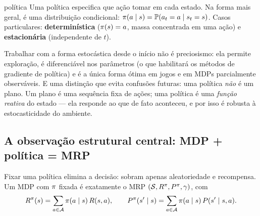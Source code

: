 \documentclass[11pt, a4paper]{article}
\begin{document}
\begin{center}
\end{center}

\begin{defbox}{política}
Uma política especifica que ação tomar em cada estado. Na forma mais geral, é uma
distribuição condicional: $\pi(a \mid s) = \mathbb{P}(a_t = a \mid s_t = s)$. Casos
particulares: \textbf{determinística} ($\pi(s) = a$, massa concentrada em uma ação) e
\textbf{estacionária} (independente de $t$).
\end{defbox}

Trabalhar com a forma estocástica desde o início não é preciosismo: ela permite
exploração, é diferenciável nos parâmetros (o que habilitará os métodos de gradiente de
política) e é a única forma ótima em jogos e em MDPs parcialmente observáveis. E uma
distinção que evita confusões futuras: uma política \emph{não} é um plano. Um plano é
uma sequência fixa de ações; uma política é uma \emph{função reativa} do estado --- ela
responde ao que de fato aconteceu, e por isso é robusta à estocasticidade do ambiente.

\subsection{A observação estrutural central: MDP + política = MRP}

Fixar uma política elimina a decisão: sobram apenas aleatoriedade e recompensa. Um MDP
com $\pi$ fixada é exatamente o MRP $(\mathcal{S}, R^{\pi}, P^{\pi}, \gamma)$, com
\[
  R^{\pi}(s) = \sum_{a \in \mathcal{A}} \pi(a \mid s)\, R(s,a),
  \qquad
  P^{\pi}(s' \mid s) = \sum_{a \in \mathcal{A}} \pi(a \mid s)\, P(s'\mid s,a).
\]
\end{document}
